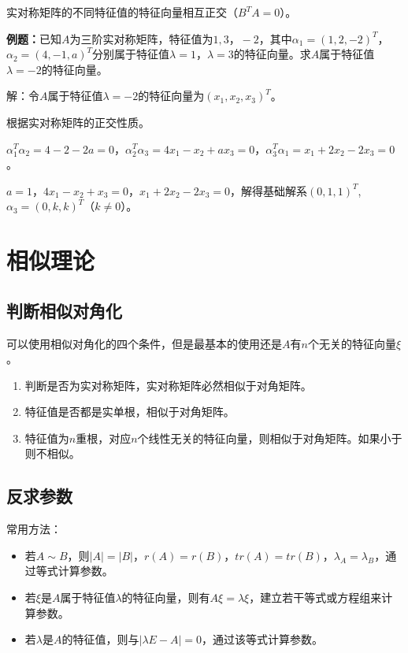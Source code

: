 \documentclass[UTF8, 12pt]{ctexart}
\begin{document}
实对称矩阵的不同特征值的特征向量相互正交（$B^TA=0$）。

\textbf{例题：}已知$A$为三阶实对称矩阵，特征值为$1,3，-2$，其中$\alpha_1=(1,2,-2)^T$，$\alpha_2=(4,-1,a)^T$分别属于特征值$\lambda=1$，$\lambda=3$的特征向量。求$A$属于特征值$\lambda=-2$的特征向量。

解：令$A$属于特征值$\lambda=-2$的特征向量为$(x_1,x_2,x_3)^T$。

根据实对称矩阵的正交性质。

$\alpha_1^T\alpha_2=4-2-2a=0$，$\alpha_2^T\alpha_3=4x_1-x_2+ax_3=0$，$\alpha_3^T\alpha_1=x_1+2x_2-2x_3=0$。

$a=1$，$4x_1-x_2+x_3=0$，$x_1+2x_2-2x_3=0$，解得基础解系$(0,1,1)^T$,$\alpha_3=(0,k,k)^T$（$k\neq0$）。

\section{相似理论}

\subsection{判断相似对角化}

可以使用相似对角化的四个条件，但是最基本的使用还是$A$有$n$个无关的特征向量$\xi$。

\begin{enumerate}
    \item 判断是否为实对称矩阵，实对称矩阵必然相似于对角矩阵。
    \item 特征值是否都是实单根，相似于对角矩阵。
    \item 特征值为$n$重根，对应$n$个线性无关的特征向量，则相似于对角矩阵。如果小于则不相似。
\end{enumerate}

\subsection{反求参数}

常用方法：

\begin{itemize}
    \item 若$A\sim B$，则$\vert A\vert=\vert B\vert$，$r(A)=r(B)$，$tr(A)=tr(B)$，$\lambda_A=\lambda_B$，通过等式计算参数。
    \item 若$\xi$是$A$属于特征值$\lambda$的特征向量，则有$A\xi=\lambda\xi$，建立若干等式或方程组来计算参数。
    \item 若$\lambda$是$A$的特征值，则与$\vert\lambda E-A\vert=0$，通过该等式计算参数。
\end{itemize}
\end{document}
